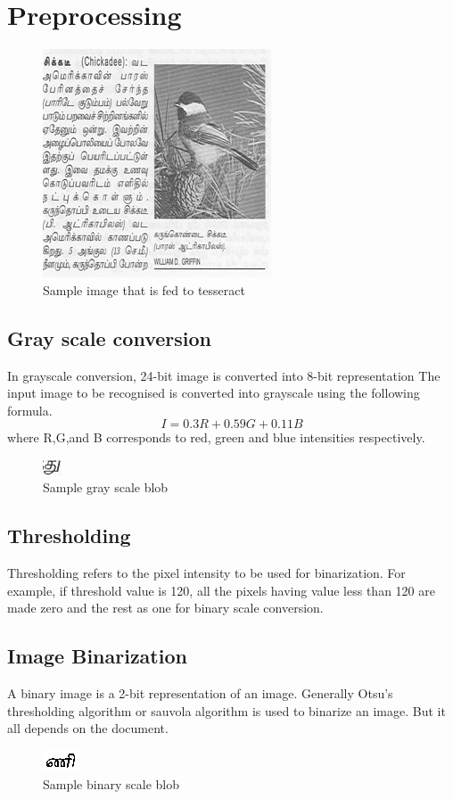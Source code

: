 \chapter{Preprocessing}
\begin{figure}\centering
\includegraphics[scale=1]{./img/input}
  \caption{Sample image that is fed to tesseract}\label{INPUT}
\end{figure}
\section{Gray scale conversion}
In grayscale conversion, 24-bit image is converted into 8-bit representation
The input image to be recognised is converted into grayscale using the following formula.
\begin{equation}
I = 0.3R + 0.59G + 0.11B
\end{equation}
where R,G,and B corresponds to red, green and blue intensities respectively.
\begin{figure}\centering
\includegraphics[scale=0.3]{./img/gray}
  \caption{Sample gray scale blob}\label{GRAY}
\end{figure}
\section{Thresholding}
Thresholding refers to the pixel intensity to be used for binarization. For example, if threshold value is 
120, all the pixels having value less than 120 are made zero and the rest as one for binary scale conversion.
\section{Image Binarization}
A binary image is a 2-bit representation of an image. Generally  Otsu's thresholding algorithm 
or sauvola algorithm is used to binarize an image. But it  all depends on the document.
\begin{figure}\centering
\includegraphics[scale=0.3]{./img/bin}
  \caption{Sample binary scale blob}\label{BIN}
\end{figure}
